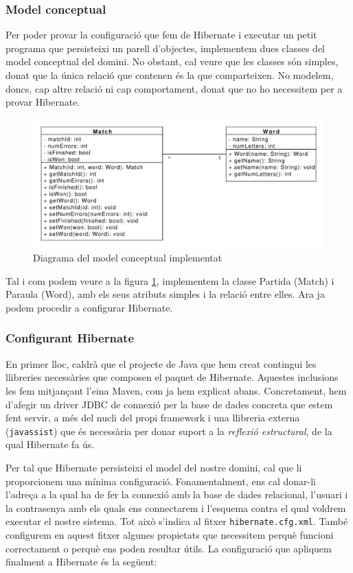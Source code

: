 \subsubsection{Model conceptual}
Per poder provar la configuració que fem de Hibernate i executar un petit programa que persisteixi un parell d'objectes, implementem dues classes del model conceptual del domini. No obstant, cal veure que les classes són simples, donat que la única relació que contenen és la que comparteixen. No modelem, doncs, cap altre relació ni cap comportament, donat que no ho necessitem per a provar Hibernate.

\begin{figure}[h]
	\centering
	\includegraphics[width=0.7\linewidth]{figures/concept_model_impl.pdf}
	\caption{Diagrama del model conceptual implementat}
	\label{fig:conceptmodel}
\end{figure}

Tal i com podem veure a la figura \ref{fig:conceptmodel}, implementem la classe Partida (Match) i Paraula (Word), amb els seus atributs simples i la relació entre elles. Ara ja podem procedir a configurar Hibernate.

\subsubsection{Configurant Hibernate}
En primer lloc, caldrà que el projecte de Java que hem creat contingui les llibreries necessàries que composen el paquet de Hibernate. Aquestes inclusions les fem mitjançant l'eina Maven, com ja hem explicat abans. Concretament, hem d'afegir un driver JDBC de connexió per la base de dades concreta que estem fent servir, a més del nucli del propi framework i una llibreria externa (\texttt{javassist}) que és necessària per donar suport a la \emph{reflexió estructural}, de la qual Hibernate fa ús.

Per tal que Hibernate persisteixi el model del nostre domini, cal que li proporcionem una mínima configuració. Fonamentalment, ens cal donar-li l'adreça a la qual ha de fer la connexió amb la base de dades relacional, l'usuari i la contrasenya amb els quals ens connectarem i l'esquema contra el qual voldrem executar el nostre sistema. Tot això s'indica al fitxer \texttt{hibernate.cfg.xml}. També configurem en aquest fitxer algunes propietats que necessitem perquè funcioni correctament o perquè ens poden resultar útils. La configuració que apliquem finalment a Hibernate és la següent:

